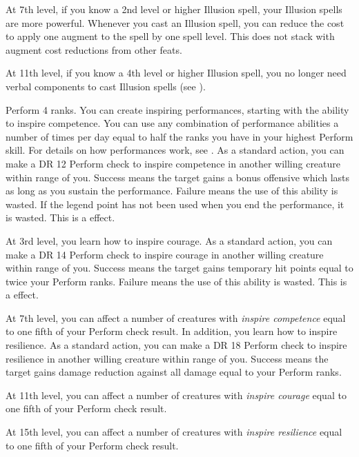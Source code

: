     At 7th level, if you know a 2nd level or higher Illusion spell, your Illusion spells are more powerful.
    Whenever you cast an Illusion spell, you can reduce the cost to apply one augment to the spell by one spell level.
    This does not stack with augment cost reductions from other feats.

    At 11th level, if you know a 4th level or higher Illusion spell, you no longer need verbal components to cast Illusion spells (see ).

    \featpre Perform 4 ranks.
    \featben You can create inspiring performances, starting with the ability to inspire competence.
    You can use any combination of performance abilities a number of times per day equal to half the ranks you have in your highest Perform skill.
    For details on how performances work, see .
    As a standard action, you can make a DR 12 Perform check to inspire competence in another willing creature within \rngmed range of you.
    Success means the target gains a bonus offensive  which lasts as long as you sustain the performance.
    Failure means the use of this ability is wasted.
    If the legend point has not been used when you end the performance, it is wasted.
    This is a  effect.

    At 3rd level, you learn how to inspire courage.
     As a standard action, you can make a DR 14 Perform check to inspire courage in another willing creature within \rngmed range of you.
    Success means the target gains temporary hit points equal to twice your Perform ranks.
    Failure means the use of this ability is wasted.
    This is a  effect.

    At 7th level, you can affect a number of creatures with \textit{inspire competence} equal to one fifth of your Perform check result.
    In addition, you learn how to inspire resilience.
     As a standard action, you can make a DR 18 Perform check to inspire resilience in another willing creature within \rngmed range of you.
    Success means the target gains damage reduction against all damage equal to your Perform ranks.

    At 11th level, you can affect a number of creatures with \textit{inspire courage} equal to one fifth of your Perform check result.

    At 15th level, you can affect a number of creatures with \textit{inspire resilience} equal to one fifth of your Perform check result.

